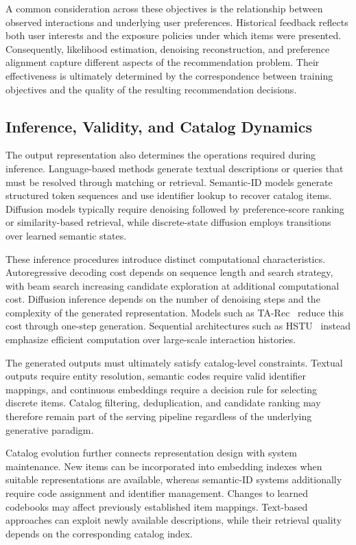 \documentclass[sigconf,nonacm]{acmart}
\begin{document}
A common consideration across these objectives
is the relationship between observed interactions
and underlying user preferences. Historical
feedback reflects both user interests and
the exposure policies under which items were
presented. Consequently, likelihood estimation,
denoising reconstruction, and preference alignment
capture different aspects of the recommendation
problem. Their effectiveness is ultimately
determined by the correspondence between
training objectives and the quality of the
resulting recommendation decisions.

\subsection{Inference, Validity, and Catalog Dynamics}

The output representation also determines the
operations required during inference. Language-based
methods generate textual descriptions or queries
that must be resolved through matching or retrieval.
Semantic-ID models generate structured token
sequences and use identifier lookup to recover
catalog items. Diffusion models typically require
denoising followed by preference-score ranking
or similarity-based retrieval, while discrete-state
diffusion employs transitions over learned
semantic states.

These inference procedures introduce distinct
computational characteristics. Autoregressive
decoding cost depends on sequence length and search
strategy, with beam search increasing candidate
exploration at additional computational cost.
Diffusion inference depends on the number of
denoising steps and the complexity of the generated
representation. Models such as TA-Rec~\cite{tarec}
reduce this cost through one-step generation.
Sequential architectures such as HSTU~\cite{hstu}
instead emphasize efficient computation over
large-scale interaction histories.

The generated outputs must ultimately satisfy
catalog-level constraints. Textual outputs require
entity resolution, semantic codes require valid
identifier mappings, and continuous embeddings
require a decision rule for selecting discrete
items. Catalog filtering, deduplication, and
candidate ranking may therefore remain part of
the serving pipeline regardless of the
underlying generative paradigm.

Catalog evolution further connects representation
design with system maintenance. New items can
be incorporated into embedding indexes when
suitable representations are available, whereas
semantic-ID systems additionally require code
assignment and identifier management. Changes
to learned codebooks may affect previously
established item mappings. Text-based approaches
can exploit newly available descriptions, while
their retrieval quality depends on the
corresponding catalog index.
\end{document}
